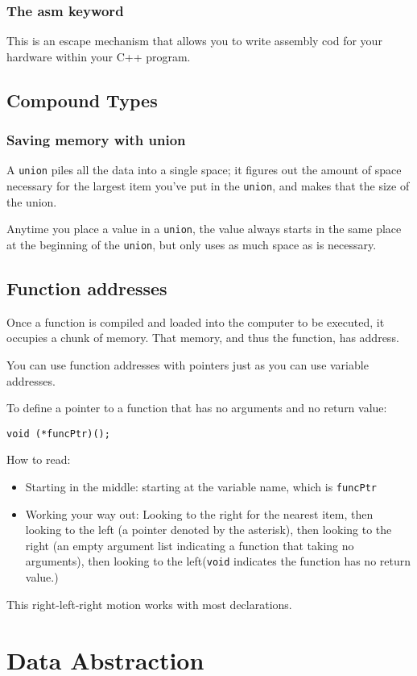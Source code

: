 \documentclass[11pt, a4paper]{book}
\begin{document}
\subsection{The asm keyword}
This is an escape mechanism that allows you to write assembly cod for your
hardware within your C++ program.
\section{Compound Types}
\subsection{Saving memory with union}
A \verb|union| piles all the data into a single space; it figures out the amount
of space necessary for the largest item you've put in the \verb|union|, and
makes that the size of the union.

Anytime you place a value in a \verb|union|, the value always starts in the same
place at the beginning of the \verb|union|, but only uses as much space as is
necessary.

\section{Function addresses}
Once a function is compiled and loaded into the computer to be executed, it
occupies a chunk of memory. That memory, and thus the function, has address.

You can use function addresses with pointers just as you can use variable
addresses.

To define a pointer to a function that has no arguments and no return value:
\begin{verbatim}
void (*funcPtr)();
\end{verbatim}
How to read:
\begin{itemize}
\item Starting in the middle: starting at the variable name, which is
\verb|funcPtr|
\item Working your way out: Looking to the right for the nearest item, then
looking to the left (a pointer denoted by the asterisk), then looking to the
right (an empty argument list indicating a function that taking no arguments),
then looking to the left(\verb|void| indicates the function has no return
value.)
\end{itemize}
This right-left-right motion works with most declarations.

\chapter{Data Abstraction}
\end{document}

